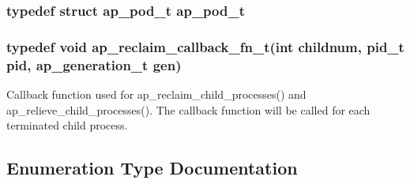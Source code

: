 \subsubsection[{\texorpdfstring{ap\+\_\+pod\+\_\+t}{ap_pod_t}}]{\setlength{\rightskip}{0pt plus 5cm}typedef struct {\bf ap\+\_\+pod\+\_\+t} {\bf ap\+\_\+pod\+\_\+t}}\hypertarget{group__APACHE__MPM_ga12f0c95a29b7205d0ebdaabc67bd22fe}{}\label{group__APACHE__MPM_ga12f0c95a29b7205d0ebdaabc67bd22fe}
\subsubsection[{\texorpdfstring{ap\+\_\+reclaim\+\_\+callback\+\_\+fn\+\_\+t}{ap_reclaim_callback_fn_t}}]{\setlength{\rightskip}{0pt plus 5cm}typedef {\bf void} ap\+\_\+reclaim\+\_\+callback\+\_\+fn\+\_\+t({\bf int} childnum, pid\+\_\+t pid, {\bf ap\+\_\+generation\+\_\+t} {\bf gen})}\hypertarget{group__APACHE__MPM_ga94be3eb6c17612b53962372f8b954837}{}\label{group__APACHE__MPM_ga94be3eb6c17612b53962372f8b954837}
Callback function used for ap\+\_\+reclaim\+\_\+child\+\_\+processes() and ap\+\_\+relieve\+\_\+child\+\_\+processes(). The callback function will be called for each terminated child process. 

\subsection{Enumeration Type Documentation}
